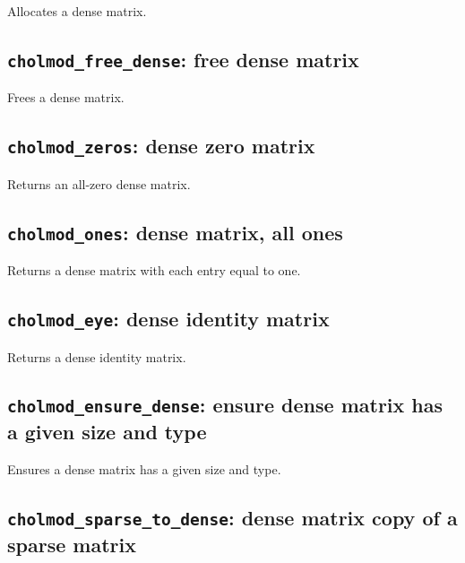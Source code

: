 \documentclass[11pt]{article}
\begin{document}

Allocates a dense matrix.

\subsection{{\tt cholmod\_free\_dense}: free dense matrix}


Frees a dense matrix.


\subsection{{\tt cholmod\_zeros}: dense zero matrix}


Returns an all-zero dense matrix.

\subsection{{\tt cholmod\_ones}: dense matrix, all ones}


Returns a dense matrix with each entry equal to one.

\subsection{{\tt cholmod\_eye}: dense identity matrix}


Returns a dense identity matrix.

\subsection{{\tt cholmod\_ensure\_dense}: ensure dense matrix has a given size
and type}


Ensures a dense matrix has a given size and type.

\subsection{{\tt cholmod\_sparse\_to\_dense}: dense matrix copy of a sparse matrix}
\end{document}
